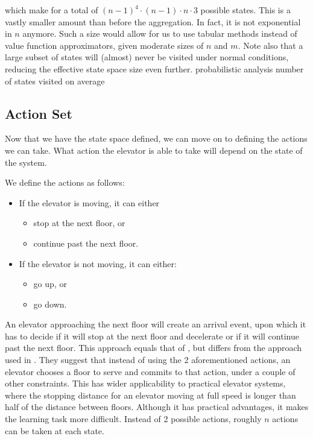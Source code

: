 which make for a total of $(n-1)^4 \cdot (n - 1) \cdot n \cdot 3$ possible states. This is a vastly smaller amount than before the aggregation. In fact, it is not exponential in $n$ anymore. Such a size would allow for us to use tabular methods instead of value function approximators, given moderate sizes of $n$ and $m$. Note also that a large subset of states will (almost) never be visited under normal conditions, reducing the effective state space size even further. {\color{red} probabilistic analysis number of states visited on average}



\subsection{Action Set}

Now that we have the state space defined, we can move on to defining the actions we can take. What action the elevator is able to take will depend on the state of the system.

We define the actions as follows:

\begin{itemize}
    \item If the elevator is moving, it can either
        \begin{itemize}
            \item stop at the next floor, or
            \item continue past the next floor.
        \end{itemize}

    \item If the elevator is not moving, it can either:
        \begin{itemize}
            \item go up, or
            \item go down.
        \end{itemize}
\end{itemize}

An elevator approaching the next floor will create an arrival event, upon which it has to decide if it will stop at the next floor and decelerate or if it will continue past the next floor. This approach equals that of \cite{crites_barto_1998, crites_barto_group_1998}, but differs from the approach used in \cite{walczak2006}. They suggest that instead of using the 2 aforementioned actions, an elevator chooses a floor to serve and commits to that action, under a couple of other constraints. This has wider applicability to practical elevator systems, where the stopping distance for an elevator moving at full speed is longer than half of the distance between floors. Although it has practical advantages, it makes the learning task more difficult. Instead of 2 possible actions, roughly $n$ actions can be taken at each state.

